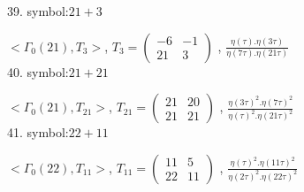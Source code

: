 39. symbol:$ 21+3 $

$ < \Gamma_0 ( 21 ), T_3 >  $,
$
T_3 = 
\left(
\begin{array}{cc}
-6 & -1 \\
21 & 3
\end{array}
\right)
$
, {$ \frac{\eta(\tau) . \eta(3\tau)}{\eta(7\tau) . \eta(21\tau)} $}
\\

40. symbol:$ 21+21 $

$ < \Gamma_0 ( 21 ), T_{21} >  $,
$
T_{21} = 
\left(
\begin{array}{cc}
21 & 20 \\
21 & 21
\end{array}
\right)
$
, {$ \frac{\eta(3\tau)^2 . \eta(7\tau)^2}{\eta(\tau)^2 . \eta(21\tau)^2} $}
\\

41. symbol:$ 22+11 $

$ < \Gamma_0 ( 22 ), T_{11} >  $,
$
T_{11} = 
\left(
\begin{array}{cc}
11 & 5 \\
22 & 11
\end{array}
\right)
$
, {$ \frac{\eta(\tau)^2 . \eta(11\tau)^2}{\eta(2\tau)^2 . \eta(22\tau)^2} $}
\\